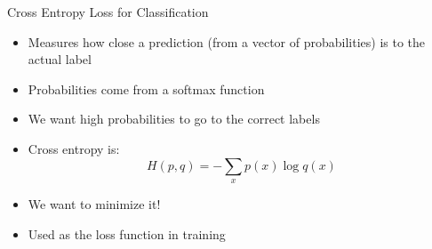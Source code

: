 \documentclass[aspectratio=169]{beamer}
\begin{document}
\begin{frame}{Cross Entropy Loss for Classification}

\begin{itemize}
\item Measures how close a prediction (from a vector of probabilities) is to the actual label
\item Probabilities come from a softmax function
\item We want high probabilities to go to the correct labels
\item Cross entropy is:
$$H(p, q) = -\sum_x p(x) \log q (x)$$
\item We want to minimize it!
\item Used as the loss function in training
\end{itemize}

\end{frame}
%
%
\end{document}
